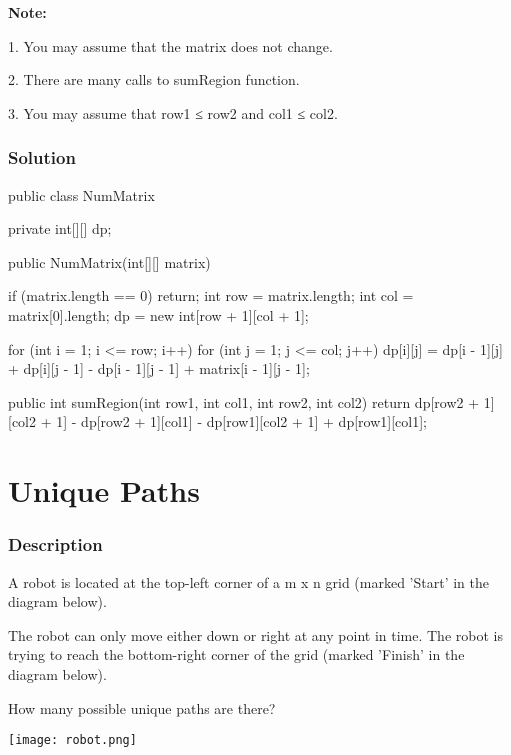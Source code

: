 \textbf{Note:}

1. You may assume that the matrix does not change.

2. There are many calls to sumRegion function.

3. You may assume that row1 ≤ row2 and col1 ≤ col2.

\subsubsection{Solution}

\begin{Code}
public class NumMatrix {
    private int[][] dp;

    public NumMatrix(int[][] matrix) {
        if (matrix.length == 0) {
            return;
        }
        int row = matrix.length;
        int col = matrix[0].length;
        dp = new int[row + 1][col + 1];

        for (int i = 1; i <= row; i++) {
            for (int j = 1; j <= col; j++) {
                dp[i][j] = dp[i - 1][j] + dp[i][j - 1] - dp[i - 1][j - 1] + matrix[i - 1][j - 1];
            }
        }
    }

    public int sumRegion(int row1, int col1, int row2, int col2) {
        return dp[row2 + 1][col2 + 1] - dp[row2 + 1][col1] - dp[row1][col2 + 1] + dp[row1][col1];
    }
}
\end{Code}

\newpage

\section{Unique Paths} %

\subsubsection{Description}
A robot is located at the top-left corner of a m x n grid (marked 'Start' in the diagram below).

The robot can only move either down or right at any point in time. The robot is trying to reach the bottom-right corner of the grid (marked 'Finish' in the diagram below).

How many possible unique paths are there?

\begin{center}
\texttt{[image: robot.png]}\\
\end{center}

